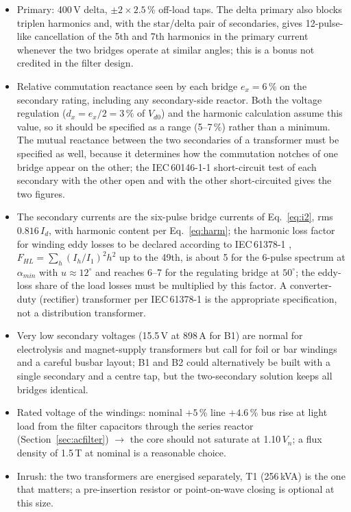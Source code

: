 \documentclass[11pt,a4paper]{article}
\newcommand{\Vdo}{V_{d0}}
\newcommand{\Id}{I_d}
\newcommand{\ex}{e_x}
\newcommand{\dx}{d_x}
\begin{document}
\begin{itemize}
\item Primary: 400\,V delta, $\pm2\times2.5$\,\% off-load taps. The delta primary also blocks triplen harmonics and, with the star/delta pair of secondaries, gives 12-pulse-like cancellation of the 5th and 7th harmonics in the primary current whenever the two bridges operate at similar angles; this is a bonus not credited in the filter design.
\item Relative commutation reactance seen by each bridge $\ex = 6$\,\% on the secondary rating, including any secondary-side reactor. Both the voltage regulation ($\dx = \ex/2 = 3$\,\% of $\Vdo$) and the harmonic calculation assume this value, so it should be specified as a range (5--7\,\%) rather than a minimum. The mutual reactance between the two secondaries of a transformer must be specified as well, because it determines how the commutation notches of one bridge appear on the other; the IEC\,60146-1-1 short-circuit test of each secondary with the other open and with the other short-circuited gives the two figures.
\item The secondary currents are the six-pulse bridge currents of Eq.~\eqref{eq:i2}, rms $0.816\,\Id$, with harmonic content per Eq.~\eqref{eq:harm}; the harmonic loss factor for winding eddy losses to be declared according to IEC\,61378-1 \cite{iec61378}, $F_{HL} = \sum_h (I_h/I_1)^2 h^2$ up to the 49th, is about 5 for the 6-pulse spectrum at $\alpha_{min}$ with $u \approx 12^\circ$ and reaches 6--7 for the regulating bridge at $50^\circ$; the eddy-loss share of the load losses must be multiplied by this factor. A converter-duty (rectifier) transformer per IEC\,61378-1 is the appropriate specification, not a distribution transformer.
\item Very low secondary voltages (15.5\,V at 898\,A for B1) are normal for electrolysis and magnet-supply transformers but call for foil or bar windings and a careful busbar layout; B1 and B2 could alternatively be built with a single secondary and a centre tap, but the two-secondary solution keeps all bridges identical.
\item Rated voltage of the windings: nominal $+5$\,\% line $+4.6$\,\% bus rise at light load from the filter capacitors through the series reactor (Section~\ref{sec:acfilter}) $\rightarrow$ the core should not saturate at 1.10\,$V_n$; a flux density of 1.5\,T at nominal is a reasonable choice.
\item Inrush: the two transformers are energised separately, T1 (256\,kVA) is the one that matters; a pre-insertion resistor or point-on-wave closing is optional at this size.
\end{itemize}
\end{document}
